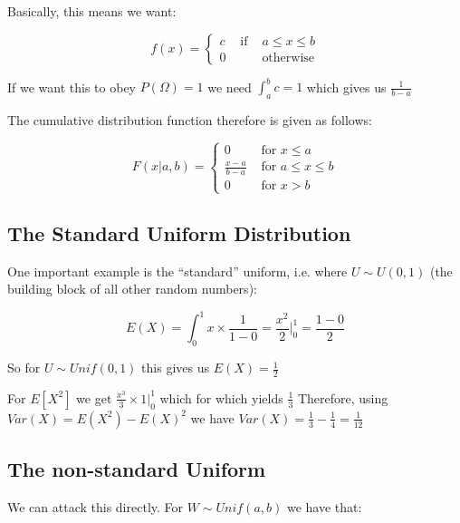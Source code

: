 \documentclass[12pt]{extbook}
\begin{document}
Basically, this means we want:

\begin{displaymath}
f(x) = \left\{ \begin{array}{rrr} c & \mbox{ if } & a \leq x \leq b\\
0 & & \mbox{otherwise} \end{array} \right.
\end{displaymath}

If we want this to obey $P(\Omega)=1$ we need $\int_a^bc=1$ which gives us $\frac{1}{b-a}$

The cumulative distribution function therefore is given as follows:

\begin{displaymath}
F(x|a,b) = \left\{ \begin{array}{ll} 0 & \mbox{ for }  x \leq a \\
\frac{x-a}{b-a} & \mbox{ for } a \leq x \leq b \\ 
0 & \mbox{ for } x > b \end{array} \right. 
\end{displaymath}


\subsection{The Standard Uniform Distribution}

One important example is the ``standard'' uniform, i.e. where $U \sim U(0,1)$ (the building block of all other random numbers):


\begin{displaymath}
E(X) = \int_0^1 x \times\frac{1}{1-0} = \frac{x^2}{2}|^1_0=\frac{1-0}{2}
\end{displaymath}

So for $U \sim Unif(0,1)$ this gives us $E(X) = \frac{1}{2}$

For $E[X^2]$ we get $\frac{x^3}{3} \times 1 |^1_0$ which for which yields $\frac{1}{3}$  Therefore, using $Var(X)=E(X^2)-E(X)^2$ we have $Var(X)=\frac{1}{3}-\frac{1}{4}=\frac{1}{12}$



\subsection{The non-standard Uniform}

We can attack this directly.   For $W \sim Unif(a,b)$ we have that:
\end{document}
